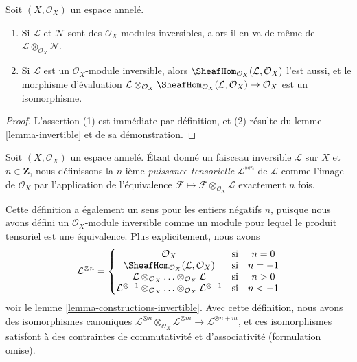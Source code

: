 \begin{lemma}
\label{lemma-constructions-invertible}
Soit $(X, \mathcal{O}_X)$ un espace annelé.
\begin{enumerate}
\item Si $\mathcal{L}$ et $\mathcal{N}$ sont des
$\mathcal{O}_X$-modules inversibles, alors il en va de même de
$\mathcal{L} \otimes_{\mathcal{O}_X} \mathcal{N}$.
\item Si $\mathcal{L}$ est un $\mathcal{O}_X$-module inversible, alors
$\SheafHom_{\mathcal{O}_X}(\mathcal{L}, \mathcal{O}_X)$ l'est aussi, et le morphisme d'évaluation
$\mathcal{L} \otimes_{\mathcal{O}_X}
\SheafHom_{\mathcal{O}_X}(\mathcal{L}, \mathcal{O}_X) \to \mathcal{O}_X$
est un isomorphisme.
\end{enumerate}
\end{lemma}

\begin{proof}
L'assertion (1) est immédiate par définition, et (2) résulte du
lemme \ref{lemma-invertible} et de sa démonstration.
\end{proof}

\begin{definition}
\label{definition-powers}
Soit $(X, \mathcal{O}_X)$ un espace annelé. Étant donné un faisceau inversible
$\mathcal{L}$ sur $X$ et $n \in \mathbf{Z}$, nous définissons la
$n$-ième {\it puissance tensorielle} $\mathcal{L}^{\otimes n}$ de $\mathcal{L}$
comme l'image de $\mathcal{O}_X$ par l'application de l'équivalence
$\mathcal{F} \mapsto\mathcal{F} \otimes_{\mathcal{O}_X} \mathcal{L}$
exactement $n$ fois.
\end{definition}

\noindent
Cette définition a également un sens pour les entiers négatifs $n$, puisque nous avons
défini un $\mathcal{O}_X$-module inversible comme un module pour lequel le produit tensoriel
est une équivalence. Plus explicitement, nous avons
$$
\mathcal{L}^{\otimes n} =
\left\{
\begin{matrix}
\mathcal{O}_X & \text{si} & n = 0 \\
\SheafHom_{\mathcal{O}_X}(\mathcal{L}, \mathcal{O}_X) & \text{si} & n = -1\\
\mathcal{L} \otimes_{\mathcal{O}_X} \ldots \otimes_{\mathcal{O}_X} \mathcal{L}
& \text{si} & n > 0 \\
\mathcal{L}^{\otimes -1} \otimes_{\mathcal{O}_X} \ldots
\otimes_{\mathcal{O}_X} \mathcal{L}^{\otimes -1}
& \text{si} & n < -1
\end{matrix}
\right.
$$
voir le lemme \ref{lemma-constructions-invertible}.
Avec cette définition, nous avons des isomorphismes canoniques
$\mathcal{L}^{\otimes n} \otimes_{\mathcal{O}_X}
\mathcal{L}^{\otimes m} \to
\mathcal{L}^{\otimes n + m}$, et ces isomorphismes
satisfont à des contraintes de commutativité et d'associativité
(formulation omise).

